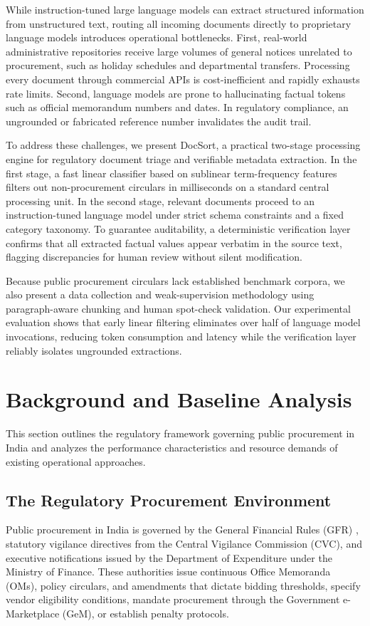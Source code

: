 \documentclass{article}
\begin{document}
While instruction-tuned large language models can extract structured information from unstructured text, routing all incoming documents directly to proprietary language models introduces operational bottlenecks. First, real-world administrative repositories receive large volumes of general notices unrelated to procurement, such as holiday schedules and departmental transfers. Processing every document through commercial APIs is cost-inefficient and rapidly exhausts rate limits. Second, language models are prone to hallucinating factual tokens such as official memorandum numbers and dates. In regulatory compliance, an ungrounded or fabricated reference number invalidates the audit trail.

To address these challenges, we present DocSort, a practical two-stage processing engine for regulatory document triage and verifiable metadata extraction. In the first stage, a fast linear classifier based on sublinear term-frequency features filters out non-procurement circulars in milliseconds on a standard central processing unit. In the second stage, relevant documents proceed to an instruction-tuned language model under strict schema constraints and a fixed category taxonomy. To guarantee auditability, a deterministic verification layer confirms that all extracted factual values appear verbatim in the source text, flagging discrepancies for human review without silent modification.

Because public procurement circulars lack established benchmark corpora, we also present a data collection and weak-supervision methodology using paragraph-aware chunking and human spot-check validation. Our experimental evaluation shows that early linear filtering eliminates over half of language model invocations, reducing token consumption and latency while the verification layer reliably isolates ungrounded extractions.

\section{Background and Baseline Analysis}

This section outlines the regulatory framework governing public procurement in India and analyzes the performance characteristics and resource demands of existing operational approaches.

\subsection{The Regulatory Procurement Environment}
Public procurement in India is governed by the General Financial Rules (GFR) \citep{manning2008introduction}, statutory vigilance directives from the Central Vigilance Commission (CVC), and executive notifications issued by the Department of Expenditure under the Ministry of Finance. These authorities issue continuous Office Memoranda (OMs), policy circulars, and amendments that dictate bidding thresholds, specify vendor eligibility conditions, mandate procurement through the Government e-Marketplace (GeM), or establish penalty protocols.
\end{document}
